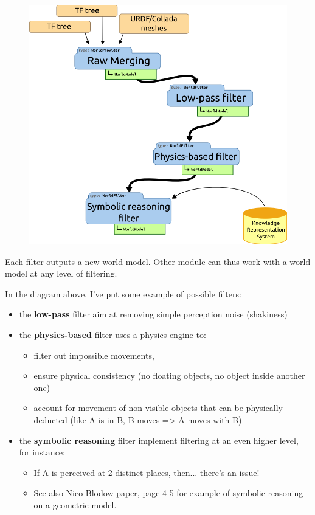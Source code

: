 \documentclass[a4paper]{article}
\begin{document}
\begin{figure}[!h]
    \centering
    \includegraphics[scale=0.5]{images/spark2_archi2_2.png}
\end{figure}

Each filter outputs a new world model. Other module can thus work with a world
model at any level of filtering.

In the diagram above, I've put some example of possible filters:

\begin{itemize}
    \item the \textbf{low-pass} filter aim at removing simple perception noise (shakiness)
    \item the \textbf{physics-based} filter uses a physics engine to:
        \begin{itemize}
            \item filter out impossible movements,
            \item ensure physical consistency (no floating objects, no object inside another one)
            \item account for movement of non-visible objects that can be physically deducted (like A is in B, B moves => A moves with B) 
        \end{itemize}

    \item the \textbf{symbolic reasoning} filter implement filtering at an even higher level, for instance:
        \begin{itemize}
            \item If A is perceived at 2 distinct places, then... there's an issue!
            \item See also Nico Blodow paper, page 4-5 for example of symbolic reasoning on a geometric model. 
        \end{itemize}
\end{itemize}
\end{document}
